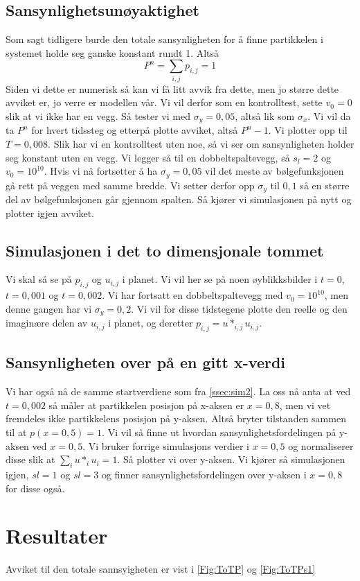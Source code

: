 \documentclass[reprint,english,notitlepage]{revtex4-2}  %
\begin{document}
\subsection{Sansynlighetsunøyaktighet}
Som sagt tidligere burde den totale sansynligheten for å finne partikkelen i systemet holde seg ganske konstant rundt 1. Altså
$$
P^n=\sum_{i,j}p_{i,j}=1
$$
Siden vi dette er numerisk så kan vi få litt avvik fra dette, men jo større dette avviket er, jo verre er modellen vår.  Vi vil derfor som en kontrolltest, sette $v_0=0$ slik at vi ikke har en vegg. Så tester vi med $\sigma_y=0,05$, altså lik som $\sigma_x$. Vi vil da ta $P^n$ for hvert tidssteg og etterpå plotte avviket, altså $P^n-1$. Vi plotter opp til $T=0,008$. Slik har vi en kontrolltest uten noe, så vi ser om sansynligheten holder seg konstant uten en vegg.
\newline Vi legger så til en dobbeltspaltevegg, så $s_l=2$ og $v_0=10^10$. Hvis vi nå fortsetter å ha $\sigma_y=0,05$ vil det meste av bølgefunksjonen gå rett på veggen med samme bredde. Vi setter derfor opp $\sigma_y$ til $0,1$ så en større del av bølgefunksjonen går gjennom spalten. Så kjører vi simulasjonen på nytt og plotter igjen avviket.
\subsection{Simulasjonen i det to dimensjonale tommet}\label{ssec:sim2}
Vi skal så se på $p_{i,j}$ og $u_{i,j}$ i planet. Vi vil her se på noen øyblikksbilder i $t=0$, $t=0,001$ og $t=0,002$. Vi har fortsatt en dobbeltspaltevegg med $v_0=10^10$, men denne gangen har vi $\sigma_y=0,2$.
Vi vil for disse tidstegene plotte den reelle og den imaginære delen av $u_{i,j}$ i planet, og deretter $p_{i,j}=u*_{i,j}u_{i,j}$.
\subsection{Sansynligheten over på en gitt x-verdi}
Vi har også nå de samme startverdiene som fra \autoref{ssec:sim2}. La oss nå anta at ved $t=0,002$ så måler at partikkelen posisjon på x-aksen er $x=0,8$, men vi vet fremdeles ikke partikkelens posisjon på y-aksen. Altså bryter tilstanden sammen til at $p(x=0,5)=1$. Vi vil så finne ut hvordan sansynlighetsfordelingen på y-aksen ved $x=0,5$. Vi bruker forrige simulasjons verdier i $x=0,5$ og normaliserer disse slik at $\sum_{i}u*_iu_i=1$. Så plotter vi over y-aksen. Vi kjører så simulasjonen igjen, $sl=1$ og $sl=3$ og finner sansynlighetsfordelingen over y-aksen i $x=0,8$ for disse også. 
\section{Resultater}
Avviket til den totale sannsyigheten er vist i \autoref{Fig:ToTP} og \autoref{Fig:ToTPs1}
\end{document}
